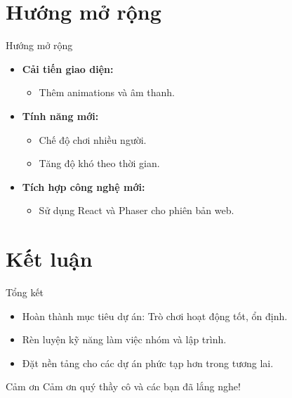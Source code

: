 \documentclass{beamer}
\begin{document}
\section{Hướng mở rộng}
\begin{frame}{Hướng mở rộng}
    \begin{itemize}
        \item \textbf{Cải tiến giao diện:}
        \begin{itemize}
            \item Thêm animations và âm thanh.
        \end{itemize}
        \item \textbf{Tính năng mới:}
        \begin{itemize}
            \item Chế độ chơi nhiều người.
            \item Tăng độ khó theo thời gian.
        \end{itemize}
        \item \textbf{Tích hợp công nghệ mới:}
        \begin{itemize}
            \item Sử dụng React và Phaser cho phiên bản web.
        \end{itemize}
    \end{itemize}
\end{frame}

\section{Kết luận}
\begin{frame}{Tổng kết}
    \begin{itemize}
        \item Hoàn thành mục tiêu dự án: Trò chơi hoạt động tốt, ổn định.
        \item Rèn luyện kỹ năng làm việc nhóm và lập trình.
        \item Đặt nền tảng cho các dự án phức tạp hơn trong tương lai.
    \end{itemize}
\end{frame}

\begin{frame}{Cảm ơn}
    \centering
    \Huge Cảm ơn quý thầy cô và các bạn đã lắng nghe!
\end{frame}
\end{document}
